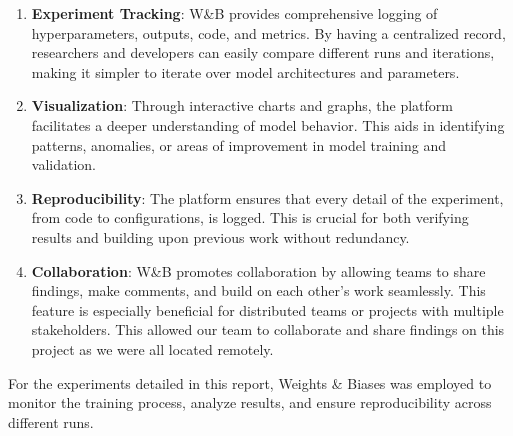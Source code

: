 \documentclass[\main/thesis.tex]{subfiles}
\begin{document}
\begin{enumerate}
    \item \textbf{Experiment Tracking}: W\&B provides comprehensive logging of hyperparameters, outputs, code, and metrics. 
    By having a centralized record, researchers and developers can easily compare different runs and iterations, 
    making it simpler to iterate over model architectures and parameters.
    
    \item \textbf{Visualization}: Through interactive charts and graphs, the platform facilitates a deeper understanding 
    of model behavior. This aids in identifying patterns, anomalies, or areas of improvement in model training and validation.
    
    \item \textbf{Reproducibility}: The platform ensures that every detail of the experiment, from code to configurations, 
    is logged. This is crucial for both verifying results and building upon previous work without redundancy.
    
    \item \textbf{Collaboration}: W\&B promotes collaboration by allowing teams to share findings, make comments, and 
    build on each other's work seamlessly. This feature is especially beneficial for distributed teams or projects with 
    multiple stakeholders. This allowed our team to collaborate and share findings on this project as we were all 
    located remotely. 
    
\end{enumerate}

For the experiments detailed in this report, Weights \& Biases was employed to monitor the training process, analyze results, 
and ensure reproducibility across different runs.
\end{document}
